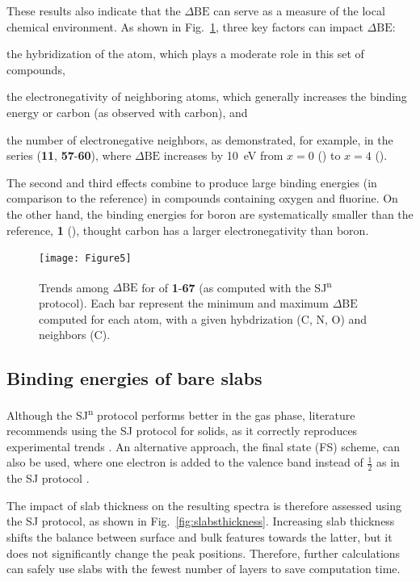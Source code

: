 \documentclass[12pt,a4paper]{article}
\def\dbe{\ensuremath{\Delta\text{BE}}}
\begin{document}
\clearpage
These results also indicate that the \dbe{} can serve as a measure of the local chemical environment. As shown in Fig.~\ref{fig:trends}, three key factors can impact \dbe{}: \begin{inparaenum}[i)]
	\item the hybridization of the atom, which plays a moderate role in this set of compounds,
	\item the electronegativity of neighboring atoms, which generally increases the binding energy or carbon (as observed with carbon), and
	\item the number of electronegative neighbors, as demonstrated, for example, in the  series (\textbf{11}, \textbf{57}-\textbf{60}), where \dbe{} increases by \SI{10}{\electronvolt} from $x=0$ () to $x=4$ ().
\end{inparaenum}
The second and third effects combine to produce large binding energies (in comparison to the reference) in compounds containing oxygen and fluorine. On the other hand, the binding energies for boron are systematically smaller than the reference, \textbf{1} (), thought carbon has a larger electronegativity than boron.



\begin{figure}[!h]
	\centering
	\texttt{[image: Figure5]}
	\caption{ Trends among \dbe{} for of \textbf{1}-\textbf{67} (as computed with the SJ\textsuperscript{n} protocol). Each bar represent the minimum and maximum \dbe{} computed for each atom, with a given hybdrization (C, N, O) and neighbors (C).}
	\label{fig:trends}
\end{figure}

\clearpage
\subsection{Binding energies of bare slabs}

Although the SJ\textsuperscript{n} protocol performs better in the gas phase, literature recommends using the SJ protocol for solids, as it correctly reproduces experimental trends \cite{olovssonCorelevelShiftsComplex2006}. An alternative approach, the final state (FS) scheme, can also be used, where one electron is added to the valence band instead of $\frac{1}{2}$ as in the SJ protocol \cite{trinhEvaluatingStructureCatalysts2013a,vandenbosscheEffectsNonlocalExchange2014}.

The impact of slab thickness on the resulting spectra is therefore assessed using the SJ protocol, as shown in Fig.~\ref{fig:slabsthickness}. Increasing slab thickness shifts the balance between surface and bulk features towards the latter, but it does not significantly change the peak positions. Therefore, further calculations can safely use slabs with the fewest number of layers to save computation time.
\end{document}
